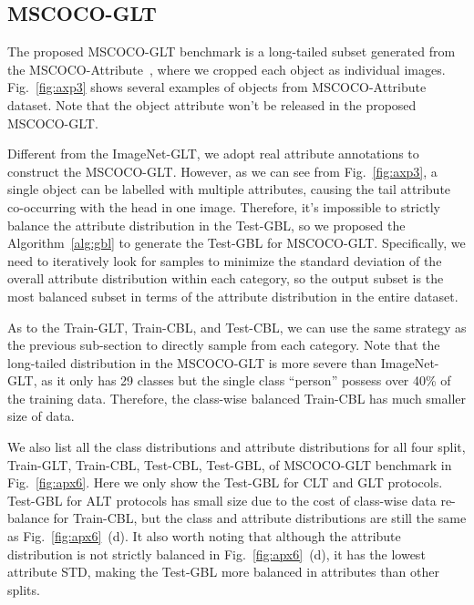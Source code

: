 \documentclass{article}
\begin{document}
\subsection{MSCOCO-GLT}
The proposed MSCOCO-GLT benchmark is a long-tailed subset generated from the MSCOCO-Attribute~\cite{patterson2016coco,lin2014microsoft}, where we cropped each object as individual images. Fig.~\ref{fig:axp3} shows several examples of objects from MSCOCO-Attribute~\cite{patterson2016coco} dataset. Note that the object attribute won't be released in the proposed MSCOCO-GLT.

Different from the ImageNet-GLT, we adopt real attribute annotations to construct the MSCOCO-GLT. However, as we can see from Fig.~\ref{fig:axp3}, a single object can be labelled with multiple attributes, causing the tail attribute co-occurring with the head in one image. Therefore, it's impossible to strictly balance the attribute distribution in the Test-GBL, so we proposed the Algorithm~\ref{alg:gbl} to generate the Test-GBL for MSCOCO-GLT. Specifically, we need to iteratively look for samples to minimize the standard deviation of the overall attribute distribution within each category, so the output subset is the most balanced subset in terms of the attribute distribution in the entire dataset.

As to the Train-GLT, Train-CBL, and Test-CBL, we can use the same strategy as the previous sub-section to directly sample from each category. Note that the long-tailed distribution in the MSCOCO-GLT is more severe than ImageNet-GLT, as it only has 29 classes but the single class ``person'' possess over 40\% of the training data. Therefore, the class-wise balanced Train-CBL has much smaller size of data. 

We also list all the class distributions and attribute distributions for all four split, Train-GLT, Train-CBL, Test-CBL, Test-GBL, of MSCOCO-GLT benchmark in Fig.~\ref{fig:apx6}. Here we only show the Test-GBL for CLT and GLT protocols. Test-GBL for ALT protocols has small size due to the cost of class-wise data re-balance for Train-CBL, but the class and attribute distributions are still the same as Fig.~\ref{fig:apx6}~(d). It also worth noting that although the attribute distribution is not strictly balanced in Fig.~\ref{fig:apx6}~(d), it has the lowest attribute STD, making the Test-GBL more balanced in attributes than other splits.
\end{document}
